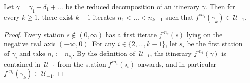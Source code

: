 \begin{lemma} \label{lemma-enough-visits-of-premain_station}
	Let $\gamma = \gamma_1 + \delta_1 + \dots $ be the reduced decomposition of an itinerary $\gamma$. Then for every $k \geq 1$, there exist $k-1$ iterates $n_1 < \dots < n_{k-1}$ such that $f^{\circ {n_i}}(\gamma_k) \subset \mathcal U_{-1}$. %
\end{lemma}

\begin{proof}
	Every station $s \not \in (0, \infty)$ has a first iterate $f^{\circ n_s}(s)$ lying on the negative real axis $(-\infty, 0)$.
	For any $i \in \{2, \dots, k-1\}$, let $s_i$ be the first station of $\gamma _i$ and take $n_i := n_{s_i}$.
	By the definition of $\,\mathcal U_{-1}$, the itinerary $f^{\circ n_i}(\gamma)$ is contained in  $\,\mathcal U_{-1}$ from the station $f^{\circ n_i}(s_i)$ onwards, and in particular $f^{\circ n_i}(\gamma_k) \subset \mathcal U_{-1}$.
\end{proof}
